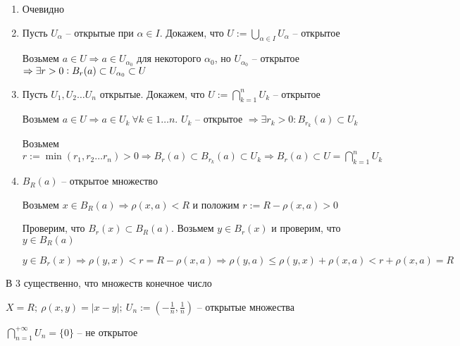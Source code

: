\documentclass[12pt]{article}
\begin{document}
\begin{enumerate}
    \item Очевидно
    \item Пусть $U_\alpha$ -- открытые при $\alpha \in I$. Докажем, что $U := \bigcup\limits_{\alpha \in I} U_\alpha$ -- открытое
    
    Возьмем $a \in U \Rightarrow a \in U_{\alpha_0}$ для некоторого $\alpha_0$, но $U_{\alpha_0}$ -- открытое $\Rightarrow \exists r > 0 : \\ B_r(a) \subset U_{\alpha_0} \subset U$

    \item Пусть $U_1, U_2 \ldots U_n$ открытые. Докажем, что $U := \bigcap\limits_{k = 1}^n U_k$ -- открытое
    
    Возьмем $a \in U \Rightarrow a \in U_k\ \forall k \in 1 \ldots n$. $U_k$ -- открытое $\Rightarrow \exists r_k > 0 : B_{r_k}(a) \subset U_k$

    Возьмем $r := \min(r_1, r_2 \ldots r_n) > 0 \Rightarrow B_r(a) \subset B_{r_k}(a) \subset U_k \Rightarrow B_r(a) \subset U = \bigcap\limits_{k = 1}^n U_k$

    \item $B_R(a)$ -- открытое множество
    
    Возьмем $x \in B_R(a) \Rightarrow \rho(x, a) < R$ и положим $r := R - \rho(x, a) > 0$

    Проверим, что $B_r(x) \subset B_R(a)$. Возьмем $y \in B_r(x)$ и проверим, что $y \in B_R(a)$

    $y \in B_r(x) \Rightarrow \rho(y, x) < r = R - \rho(x, a) \Rightarrow \rho(y, a) \leq \rho(y, x) + \rho(x, a) < r + \rho(x, a) = R$
\end{enumerate}

\begin{Remark}{}
    В 3 существенно, что множеств конечное число

    \begin{Example}{}
        $X = R;\ \rho(x, y) = |x - y|;\ U_n := (- \frac{1}{n}, \frac{1}{n})$ -- открытые множества

        $\bigcap\limits_{n = 1}^{+ \infty} U_n = \{0\}$ -- не открытое
    \end{Example}    
\end{Remark}
\end{document}
